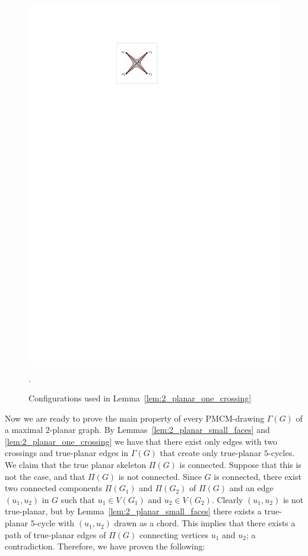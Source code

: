 \begin{figure}[htb]
\begin{minipage}[b]{.24\textwidth}
        \includegraphics[width=\textwidth,page=2]{images/2planar_one_crossing}
        \subcaption{~}\label{fig:2_planar_one_crossing_after}
    \end{minipage}
    \caption{%
    Configurations used in Lemma~\ref{lem:2_planar_one_crossing}}.
    \label{fig:2_planar_one_crossing}
\end{figure}


 
Now we are ready to prove the main property of every  PMCM-drawing $\Gamma(G)$ of a maximal $2$-planar graph. By Lemmas~\ref{lem:2_planar_small_faces} and \ref{lem:2_planar_one_crossing} we have that there exist only edges with two crossings and true-planar edges in $\Gamma(G)$ that create only true-planar $5$-cycles. 
We claim that the true planar skeleton $\Pi(G)$ is connected. Suppose that this is not the case, and that $\Pi(G)$ is not connected. Since $G$ is connected, there exist two connected components $\Pi(G_1)$ and $\Pi(G_2)$ of $\Pi(G)$ and an edge $(u_1,u_2)$ in $G$ such that $u_1\in V(G_1)$ and $u_2\in V(G_2)$. Clearly  $(u_1,u_2)$ is not true-planar, but by Lemma~\ref{lem:2_planar_small_faces} there exists a true-planar $5$-cycle with $(u_1,u_2)$ drawn as a chord. This implies that there exists a path of true-planar edges of $\Pi(G)$ connecting vertices $u_1$ and $u_2$; a contradiction. Therefore, we have proven the following:
 

